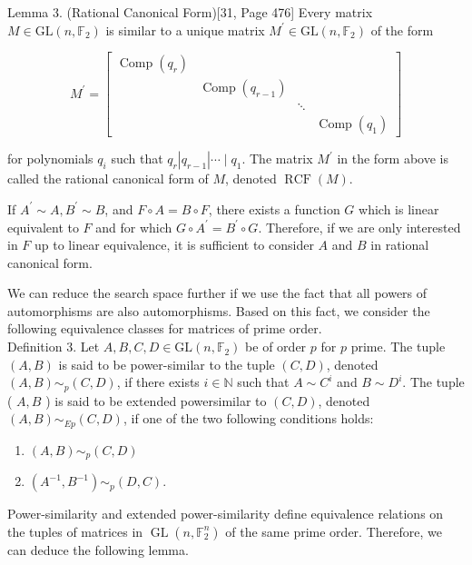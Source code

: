 \documentclass[10pt]{article}
\begin{document}
Lemma 3. (Rational Canonical Form)[31, Page 476] Every matrix $M \in \mathrm{GL}\left(n, \mathbb{F}_{2}\right)$ is similar to a unique matrix $M^{\prime} \in \mathrm{GL}\left(n, \mathbb{F}_{2}\right)$ of the form

$$
M^{\prime}=\left[\begin{array}{llll}
\operatorname{Comp}\left(q_{r}\right) & & & \\
& \operatorname{Comp}\left(q_{r-1}\right) & & \\
& & \ddots & \\
& & & \operatorname{Comp}\left(q_{1}\right)
\end{array}\right]
$$

for polynomials $q_{i}$ such that $q_{r}\left|q_{r-1}\right| \cdots \mid q_{1}$. The matrix $M^{\prime}$ in the form above is called the rational canonical form of $M$, denoted $\operatorname{RCF}(M)$.

If $A^{\prime} \sim A, B^{\prime} \sim B$, and $F \circ A=B \circ F$, there exists a function $G$ which is linear equivalent to $F$ and for which $G \circ A^{\prime}=B^{\prime} \circ G$. Therefore, if we are only interested in $F$ up to linear equivalence, it is sufficient to consider $A$ and $B$ in rational canonical form.

We can reduce the search space further if we use the fact that all powers of automorphisms are also automorphisms. Based on this fact, we consider the following equivalence classes for matrices of prime order.\\
Definition 3. Let $A, B, C, D \in \mathrm{GL}\left(n, \mathbb{F}_{2}\right)$ be of order $p$ for $p$ prime. The tuple $(A, B)$ is said to be power-similar to the tuple $(C, D)$, denoted $(A, B) \sim_{p}(C, D)$, if there exists $i \in \mathbb{N}$ such that $A \sim C^{i}$ and $B \sim D^{i}$. The tuple ( $A, B$ ) is said to be extended powersimilar to $(C, D)$, denoted $(A, B) \sim_{E p}(C, D)$, if one of the two following conditions holds:

\begin{enumerate}
  \item $(A, B) \sim_{p}(C, D)$
  \item $\left(A^{-1}, B^{-1}\right) \sim_{p}(D, C)$.
\end{enumerate}

Power-similarity and extended power-similarity define equivalence relations on the tuples of matrices in $\operatorname{GL}\left(n, \mathbb{F}_{2}^{n}\right)$ of the same prime order. Therefore, we can deduce the following lemma.
\end{document}
